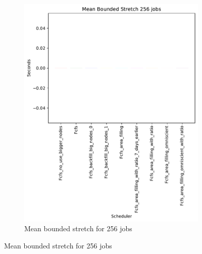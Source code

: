 \documentclass[a4paper]{article}
\begin{document}
\begin{figure}[H]
\begin{subfigure}[b]{0.4\linewidth}\centering\includegraphics[width=0.95\linewidth]{MBSS/plot/Size_Constraint_2022-01-17->2022-01-17_V10000_Mean_Stretch_With_a_Minimum_256_450_128_32_256_4_1024.pdf}\caption{Mean bounded stretch for 256 jobs}\label{45}\end{subfigure}

\end{figure}
\end{document}
